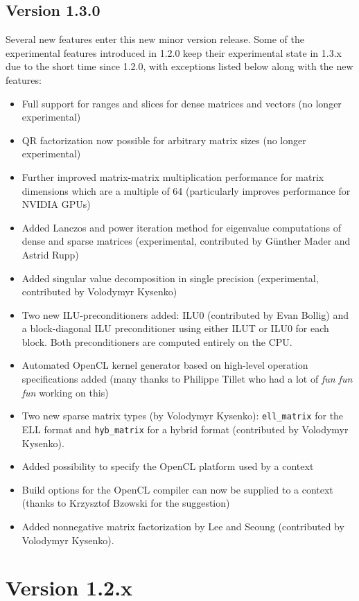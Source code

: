 \subsection*{Version 1.3.0}
Several new features enter this new minor version release.
Some of the experimental features introduced in 1.2.0 keep their experimental state in 1.3.x due to the short time since 1.2.0, with exceptions listed below along with the new features:
\begin{itemize}
 \item Full support for ranges and slices for dense matrices and vectors (no longer experimental)
 \item QR factorization now possible for arbitrary matrix sizes (no longer experimental)
 \item Further improved matrix-matrix multiplication performance for matrix dimensions which are a multiple of 64 (particularly improves performance for NVIDIA GPUs)
 \item Added Lanczos and power iteration method for eigenvalue computations of dense and sparse matrices (experimental, contributed by G\"unther Mader and Astrid Rupp)
 \item Added singular value decomposition in single precision (experimental, contributed by Volodymyr Kysenko)
 \item Two new ILU-preconditioners added: ILU0 (contributed by Evan Bollig) and a block-diagonal ILU preconditioner using either ILUT or ILU0 for each block. Both preconditioners are computed entirely on the CPU.
 \item Automated OpenCL kernel generator based on high-level operation specifications added (many thanks to Philippe Tillet who had a lot of \emph{fun fun fun} working on this)
 \item Two new sparse matrix types (by Volodymyr Kysenko): \lstinline|ell_matrix| for the ELL format and \lstinline|hyb_matrix| for a hybrid format (contributed by Volodymyr Kysenko).
 \item Added possibility to specify the OpenCL platform used by a context
 \item Build options for the OpenCL compiler can now be supplied to a context (thanks to Krzysztof Bzowski for the suggestion)
 \item Added nonnegative matrix factorization by Lee and Seoung (contributed by Volodymyr Kysenko).
\end{itemize}



\section*{Version 1.2.x}

